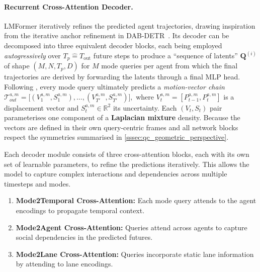 \paragraph{Recurrent Cross-Attention Decoder.}
LMFormer iteratively refines the predicted agent trajectories, drawing inspiration from the iterative anchor refinement in DAB-DETR~\cite{liu2022dabdetr}. Its decoder can be decomposed into three equivalent decoder blocks, each being employed \emph{autogressively} over \(T_{p} \hat{=} T_{\text{out}}\) future steps to produce a ``sequence of latents'' \( \mathbf{Q}^{(i)} \) of shape \((M, N, T_{p}, D)\) for \(M\) mode queries per agent from which the final trajectories are derived by forwarding the latents through a final MLP head.
Following \cite{lmformerYadav2025}, every mode query ultimately predicts a
\emph{motion-vector chain}
\(
\mathcal{T}_{out}^{a,m}
  = \bigl[(V_1^{a,m},S_1^{a,m}),\dots,(V_{T'}^{a,m},S_{T'}^{a,m})\bigr],
\)
where \(V_t^{a,m}=[P_{t-1}^{a,m},P_t^{a,m}]\) is a displacement vector and \(S_t^{a,m}\in\mathbb{R}^{2}\) its uncertainty. Each \( (V_t,S_t) \) pair parameterises one component of a \textbf{Laplacian mixture} density. Because the vectors are defined in their own query-centric frames and all network blocks respect the symmetries summarised in \autoref{sssec:qc_geometric_perspective}.

Each decoder module consists of three cross-attention blocks, each with its own set of learnable parameters, to refine the predictions iteratively. This allows the model to capture complex interactions and dependencies across multiple timesteps and modes.

\begin{enumerate}[leftmargin=*]
  \item \textbf{Mode2Temporal Cross-Attention:} Each mode query attends to the agent encodings to propagate temporal context.
  \item \textbf{Mode2Agent Cross-Attention:} Queries attend across agents to capture social dependencies in the predicted futures.
  \item \textbf{Mode2Lane Cross-Attention:} Queries incorporate static lane information by attending to lane encodings.
\end{enumerate}

